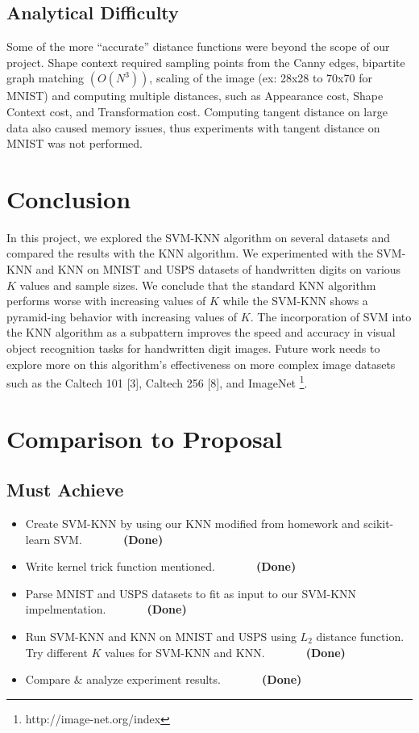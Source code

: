 \documentclass[11pt,letterpaper]{article}
\begin{document}
\subsection{Analytical Difficulty}

Some of the more ``accurate'' distance functions were beyond the scope of our project. Shape context required sampling points from the Canny edges, bipartite graph matching $(O(N^3))$, scaling of the image (ex: 28x28 to 70x70 for MNIST) and computing multiple distances, such as Appearance cost, Shape Context cost, and Transformation cost. Computing tangent distance on large data also caused memory issues, thus experiments with tangent distance on MNIST was not performed.


\section{Conclusion}

In this project, we explored the SVM-KNN algorithm on several datasets and compared the results with the KNN algorithm. We experimented with the SVM-KNN and KNN on MNIST and USPS datasets of handwritten digits on various $K$ values and sample sizes. We conclude that the standard KNN algorithm performs worse with increasing values of $K$ while the SVM-KNN shows a pyramid-ing behavior with increasing values of $K$. The incorporation of SVM into the KNN algorithm as a subpattern improves the speed and accuracy in visual object recognition tasks for handwritten digit images. Future work needs to explore more on this algorithm's effectiveness on more complex image datasets such as the Caltech 101 [3], Caltech 256 [8], and ImageNet \footnote{http://image-net.org/index}.

\section{Comparison to Proposal}

\subsection{Must Achieve}

\begin{itemize}
\item Create SVM-KNN by using our KNN modified from homework and scikit-learn SVM. $\>\>\>\>\>\>\>\>\>\>\>\>\>\>\>$\textbf{(Done)}
\item Write kernel trick function mentioned. $\>\>\>\>\>\>\>\>\>\>\>\>\>\>\>$\textbf{(Done)}
\item Parse MNIST and USPS datasets to fit as input to our SVM-KNN impelmentation. $\>\>\>\>\>\>\>\>\>\>\>\>\>\>\>$\textbf{(Done)}
\item Run SVM-KNN and KNN on MNIST and USPS using $L_2$ distance function. Try different $K$ values for SVM-KNN and KNN. $\>\>\>\>\>\>\>\>\>\>\>\>\>\>\>$\textbf{(Done)}
\item Compare $\&$ analyze experiment results. $\>\>\>\>\>\>\>\>\>\>\>\>\>\>\>$\textbf{(Done)}
\end{itemize}
\end{document}
